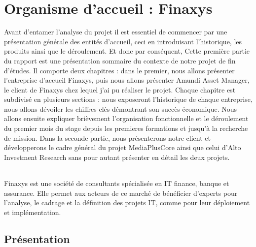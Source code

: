 \setlength{\parskip}{0.8em}



\chapter{Organisme d’accueil : Finaxys} %

\label{Chapter01} %

\par
Avant d'entamer l’analyse du projet il est essentiel de commencer par une présentation générale des entités d’accueil, ceci en introduisant l'historique, les produits ainsi que le déroulement. Et donc par conséquent, Cette première partie du rapport est une présentation sommaire du contexte de notre projet de fin d’études. Il comporte deux chapitres : dans le premier, nous allons présenter l’entreprise d’accueil Finaxys, puis nous allons présenter Amundi Asset Manager, le client de Finaxys chez lequel j'ai pu réaliser le projet.
Chaque chapitre est subdivisé en plusieurs sections : nous exposeront l'historique de chaque entreprise, nous allons dévoiler les chiffres clés démontrant son succès économique. Nous allons ensuite expliquer brièvement l'organisation fonctionnelle et le déroulement du premier mois du stage depuis les premieres formations et jusqu'à la recherche de mission. Dans la seconde partie, nous présenterons notre client et développerons le cadre général du projet MediaPlusCore ainsi que celui d'Alto Investment Research sans pour autant présenter en détail les deux projets.
\\~\\
\par
Finaxys est une société de consultants spécialisée en IT finance, banque et assurance. Elle permet aux acteurs de ce marché de bénéficier d’experts pour l’analyse, le cadrage et la définition des projets IT, comme pour leur déploiement et implémentation.

\section{Présentation}

